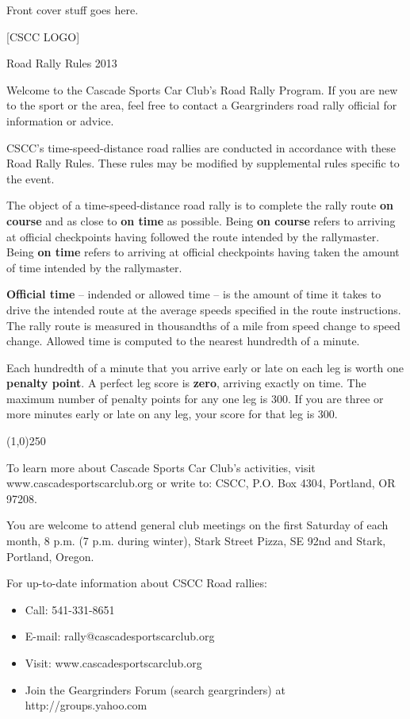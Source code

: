 \documentclass[letterpaper,11pt]{article}
\begin{document}
\pagestyle{empty}

Front cover stuff goes here.

[CSCC LOGO]

Road Rally Rules 2013

\clearpage

Welcome to the Cascade Sports Car Club's Road Rally Program. If you are new to
the sport or the area, feel free to contact a Geargrinders road rally official
for information or advice.

CSCC's time-speed-distance road rallies are conducted in accordance with these
Road Rally Rules. These rules may be modified by supplemental rules specific to
the event.

The object of a time-speed-distance road rally is to complete the rally route
\textbf{on course} and as close to \textbf{on time} as possible. Being \textbf{on
course} refers to arriving at official checkpoints having followed the route
intended by the rallymaster. Being \textbf{on time} refers to arriving at official
checkpoints having taken the amount of time intended by the rallymaster.

\textbf{Official time} -- indended or allowed time -- is the amount of
time it takes to drive the intended route at the average speeds specified in the
route instructions. The rally route is measured in thousandths of a mile from
speed change to speed change. Allowed time is computed to the nearest hundredth
of a minute.

Each hundredth of a minute that you arrive early or late on each leg is worth
one \textbf{penalty point}. A perfect leg score is \textbf{zero}, arriving exactly
on time. The maximum number of penalty points for any one leg is 300. If you are
three or more minutes early or late on any leg, your score for that leg is 300.

\begin{center}
\line(1,0){250}
\end{center}

To learn more about Cascade Sports Car Club's activities, visit www.cascadesportscarclub.org or write to: CSCC, P.O. Box 4304, Portland, OR 97208.

You are welcome to attend general club meetings on the first Saturday of each month, 8 p.m. (7 p.m. during winter), Stark Street Pizza, SE 92nd and Stark, Portland, Oregon.

For up-to-date information about CSCC Road rallies:
\begin{itemize}
  \item Call: 541-331-8651
  \item E-mail: rally@cascadesportscarclub.org
  \item Visit: www.cascadesportscarclub.org
  \item Join the Geargrinders Forum (search geargrinders) at http://groups.yahoo.com
\end{itemize}
\end{document}
